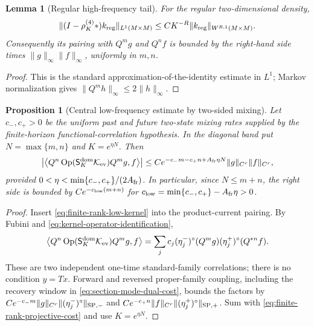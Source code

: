 \documentclass[11pt]{article}
\newtheorem{proposition}[theorem]{Proposition}
\newtheorem{lemma}[theorem]{Lemma}
\begin{document}
\begin{lemma}[Regular high-frequency tail]
\label{lem:regular-high-tail}
For the regular two-dimensional density,
\begin{equation}
\label{eq:regular-high-tail}
 \|(I-\rho_K^{(4)}*)k_{\rm reg}\|_{L^1(M\times M)}
 \le CK^{-R}\|k_{\rm reg}\|_{W^{R,1}(M\times M)}.
\end{equation}
Consequently its pairing with $Q^mg$ and $Q^nf$ is bounded by the right-hand
side times $\|g\|_\infty\|f\|_\infty$, uniformly in $m,n$.
\end{lemma}

\begin{proof}
This is the standard approximation-of-the-identity estimate in $L^1$; Markov
normalization gives $\|Q^mh\|_\infty\le2\|h\|_\infty$.
\end{proof}

\begin{proposition}[Central low-frequency estimate by two-sided mixing]
\label{prop:functional-correlation-low-frequency}
Let $c_-,c_+>0$ be the uniform past and future two-state mixing rates supplied
by the finite-horizon functional-correlation hypothesis.  In the diagonal band put
$N=\max\{m,n\}$ and $K=e^{\eta N}$.  Then
\begin{equation}
\label{eq:functional-correlation-low-frequency}
 \left|\left\langle Q^n
 \operatorname{Op}(\mathsf S_K^{\rm dom}\mathcal K_{\rm ev})Q^mg,
 f\right\rangle\right|
 \le C e^{-c_-m-c_+n+A_{\rm fr}\eta N}
 \|g\|_{C^r}\|f\|_{C^r},
\end{equation}
provided $0<\eta<\min\{c_-,c_+\}/(2A_{\rm fr})$.  In particular, since
$N\le m+n$, the right side is bounded by $Ce^{-c_{\rm low}(m+n)}$ for
$c_{\rm low}=\min\{c_-,c_+\}-A_{\rm fr}\eta>0$.
\end{proposition}

\begin{proof}
Insert \eqref{eq:finite-rank-low-kernel} into the product-current pairing.  By
Fubini and \eqref{eq:kernel-operator-identification},
\[
 \left\langle Q^n\operatorname{Op}(\mathsf S_K^{\rm dom}\mathcal K_{\rm ev})
 Q^mg,f\right\rangle
 =\sum_jc_j(\eta_j^-)^\circ(Q^mg)
              (\eta_j^+)^\circ(Q^{*n}f).
\]
These are two independent one-time standard-family correlations; there is no
condition $y=Tx$.  Forward and reversed proper-family coupling, including
the recovery window in \eqref{eq:section-mode-dual-cost}, bounds the factors by
$Ce^{-c_-m}\|g\|_{C^r}\|(\eta_j^-)^\circ\|_{\rm SP,-}$ and
$Ce^{-c_+n}\|f\|_{C^r}\|(\eta_j^+)^\circ\|_{\rm SP,+}$.  Sum with
\eqref{eq:finite-rank-projective-cost} and use $K=e^{\eta N}$.
\end{proof}
\end{document}

